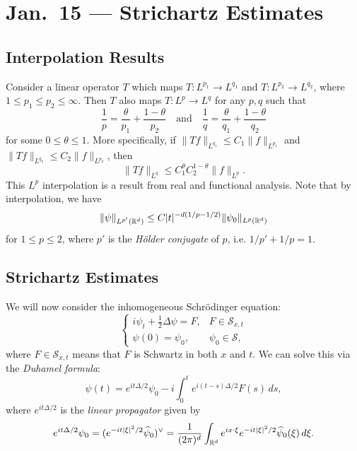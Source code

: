 \chapter{Jan.~15 --- Strichartz Estimates}

\section{Interpolation Results}
\begin{remark}[Interpolation]
  Consider a linear operator $T$ which maps
  $T : L^{p_1} \to L^{q_1}$ and
  $T : L^{p_2} \to L^{q_2}$, where $1 \le p_1 \le p_2 \le \infty$.
  Then $T$ also maps $T : L^p \to L^q$ for any $p, q$
  such that
  \[
    \frac{1}{p} = \frac{\theta}{p_1} + \frac{1 - \theta}{p_2}
    \quad \text{and} \quad
    \frac{1}{q} = \frac{\theta}{q_1} + \frac{1 - \theta}{q_2}
  \]
  for some $0 \le \theta \le 1$. More specifically, if
  $\|Tf\|_{L^{q_1}} \le C_1 \|f\|_{L^{p_1}}$ and
  $\|Tf\|_{L^{q_2}} \le C_2 \|f\|_{L^{p_2}}$, then
  \[
    \|Tf\|_{L^q} \le C_1^\theta C_2^{1 - \theta} \|f\|_{L^p}.
  \]
  This $L^p$ interpolation is a result from real and
  functional analysis. Note that by interpolation,
  we have
  \[
    \|\psi\|_{L^{p'}(\mathbb{R}^d)} \le C |t|^{-d(1 / p - 1 / 2)} \|\psi_0\|_{L^p(\mathbb{R}^d)}
  \]
  for $1 \le p \le 2$, where $p'$ is the
  \emph{H\"older conjugate} of $p$, i.e.
  $1 / p' + 1 / p = 1$.
\end{remark}

\section{Strichartz Estimates}

\begin{remark}
  We will now consider the inhomogeneous Schr\"odinger
  equation:
  \[
    \begin{cases}
      i \psi_t + \frac{1}{2}\Delta \psi = F, & F \in \mathcal{S}_{x, t} \\
      \psi(0) = \psi_0, & \psi_0 \in \mathcal{S},
    \end{cases}
  \]
  where $F \in \mathcal{S}_{x, t}$ means that $F$ is
  Schwartz in both $x$ and $t$. We can solve this
  via the \emph{Duhamel formula}:
  \[
    \psi(t) = e^{i t \Delta / 2} \psi_0 - i \int_0^t e^{i(t - s) \Delta / 2} F(s)\, ds,
  \]
  where $e^{it \Delta / 2}$ is the \emph{linear
  propagator} given by
  \[
    e^{it \Delta / 2} \psi_0
    = (e^{-it |\xi|^2 / 2} \widehat{\psi}_0)^\vee
    = \frac{1}{(2\pi)^d} \int_{\mathbb{R}^d} e^{ix \cdot \xi} e^{-it |\xi|^2 / 2} \widehat{\psi}_0(\xi)\, d\xi.
  \]
\end{remark}

